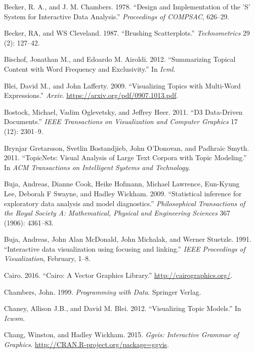 \documentclass[12pt,]{isuthesis}
\begin{document}
\hypertarget{ref-S:1978}{}
Becker, R. A., and J. M. Chambers. 1978. ``Design and Implementation of
the 'S' System for Interactive Data Analysis.'' \emph{Proceedings of
COMPSAC}, 626--29.

\hypertarget{ref-brushing-scatterplots}{}
Becker, RA, and WS Cleveland. 1987. ``Brushing Scatterplots.''
\emph{Technometrics} 29 (2): 127--42.

\hypertarget{ref-Bischof}{}
Bischof, Jonathan M., and Edoardo M. Airoldi. 2012. ``Summarizing
Topical Content with Word Frequency and Exclusivity.'' In \emph{Icml}.

\hypertarget{ref-Blei-2009}{}
Blei, David M., and John Lafferty. 2009. ``Visualizing Topics with
Multi-Word Expressions.'' \emph{Arxiv}.
\url{https://arxiv.org/pdf/0907.1013.pdf}.

\hypertarget{ref-d3}{}
Bostock, Michael, Vadim Oglevetsky, and Jeffrey Heer. 2011. ``D3
Data-Driven Documents.'' \emph{IEEE Transactions on Visualization and
Computer Graphics} 17 (12): 2301--9.

\hypertarget{ref-Gretarsson}{}
Brynjar Gretarsson, Svetlin Bostandjieb, John O'Donovan, and Padhraic
Smyth. 2011. ``TopicNets: Visual Analysis of Large Text Corpora with
Topic Modeling.'' In \emph{ACM Transactions on Intelligent Systems and
Technology}.

\hypertarget{ref-Buja:2009hp}{}
Buja, Andreas, Dianne Cook, Heike Hofmann, Michael Lawrence, Eun-Kyung
Lee, Deborah F Swayne, and Hadley Wickham. 2009. ``Statistical inference
for exploratory data analysis and model diagnostics.''
\emph{Philosophical Transactions of the Royal Society A: Mathematical,
Physical and Engineering Sciences} 367 (1906): 4361--83.

\hypertarget{ref-Buja:1991vh}{}
Buja, Andreas, John Alan McDonald, John Michalak, and Werner Stuetzle.
1991. ``Interactive data visualization using focusing and linking.''
\emph{IEEE Proceedings of Visualization}, February, 1--8.

\hypertarget{ref-cairo}{}
Cairo. 2016. ``Cairo: A Vector Graphics Library.''
\url{http://cairographics.org/}.

\hypertarget{ref-Chambers:1999}{}
Chambers, John. 1999. \emph{Programming with Data}. Springer Verlag.

\hypertarget{ref-Blei-2012}{}
Chaney, Allison J.B., and David M. Blei. 2012. ``Visualizing Topic
Models.'' In \emph{Icwsm}.

\hypertarget{ref-ggvis}{}
Chang, Winston, and Hadley Wickham. 2015. \emph{Ggvis: Interactive
Grammar of Graphics}. \url{http://CRAN.R-project.org/package=ggvis}.
\end{document}
